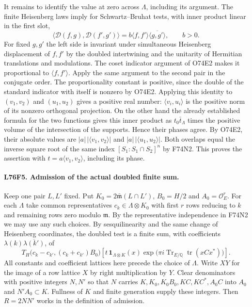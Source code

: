 It remains to identify the value at zero across $\Lambda$,
including its argument. The finite Heisenberg laws imply for
Schwartz--Bruhat tests, with inner product linear in the first slot,
\[
 \langle\mathcal D(f,g),\mathcal D(f',g')\rangle
    = b\langle f,f'\rangle\overline{\langle g,g'\rangle},
 \qquad b>0 .
\]
For fixed $g,g'$ the left side is invariant under simultaneous
Heisenberg displacement of $f,f'$ by the doubled intertwining and
the unitarity of Hermitian translations and modulations. The coset
indicator argument of O74E2 makes it proportional to $\langle
f,f'\rangle$. Apply the same argument to the second pair in the
conjugate order. The proportionality constant is positive, since
the double of the standard indicator with itself is nonzero by
O74E2. Applying this identity to $(v_1,v_2)$ and $(u_1,u_2)$
gives a positive real number: $\langle v_i,u_i\rangle$ is the
positive norm of its nonzero orthogonal projection. On the other
hand the already established formula for the two functions gives
this inner product as $t_0\bar t_\Lambda$ times the positive
volume of the intersection of the supports. Hence their phases
agree. By O74E2, their absolute values are
$|a|\,|\langle v_1,v_2\rangle|$ and
$|a|\,|\langle u_1,u_2\rangle|$. Both overlaps equal the
inverse square root of the same index
$[S_1:S_1\cap S_2]^n$ by F74N2. This proves the assertion with
$t=a\langle v_1,v_2\rangle$, including its phase.

\paragraph{L76F5. Admission of the actual doubled finite sum.}
Keep one pair $L,L'$ fixed. Put
$K_0=2\bar{\mathfrak m}(L\cap L')$, $B_0=H/2$ and
$A_0=\mathcal O_E^r$. For each $\Lambda$ take common representatives
$c_k\in\Lambda\otimes K_0$ with first $r$ rows reducing to $k$
and remaining rows zero modulo $\mathfrak m$. By the
representative independence in F74N2 we may use any such choices.
By sesquilinearity and the same change of Heisenberg coordinates,
the doubled test is a finite sum, with coefficients
$\lambda(k)\overline{\lambda(k')}$, of
\[
 T_H\big(c_k-c_{k'},(c_k+c_{k'})B_0\big)
 \left[t\,\mathbf1_{\Lambda\otimes K}(x)
     \exp\!\big(\pi i\operatorname{Tr}_{E/\mathbb Q}
                         \operatorname{tr}(xCx^*)\big)\right].
\]
All constants and coefficient lattices here precede the choice
of $\Lambda$. Write $XY$ for the image of a row lattice $X$ by
right multiplication by $Y$. Clear denominators with positive
integers $N,N'$ so that $N$ carries
$K,K_0,K_0B_0,KC,KC^*,A_0 C$ into $A_0$ and $N'A_0\subset K$.
Fullness of $K$ and finite generation supply these integers.
Then $R=2NN'$ works in the definition of admission.

